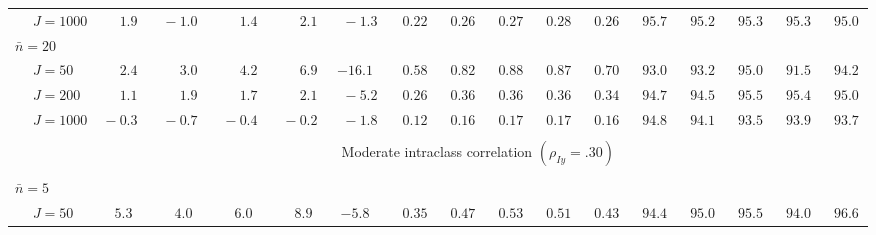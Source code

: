 \begin{sidewaystable}
\begin{threeparttable}
\begin{tabular}{llccccccccccccccc}
 & \nopagebreak $\;J=1000$  & $\phantom{0}\phantom{-}1.9\phantom{0}$ & $\phantom{0}{-}1.0\phantom{0}$ & $\phantom{0}\phantom{-}1.4\phantom{0}$ & $\phantom{0}\phantom{-}2.1\phantom{0}$ & $\phantom{0}{-}1.3\phantom{0}$ & $\phantom{0}0.22\phantom{0}$ & $\phantom{0}0.26\phantom{0}$ & $\phantom{0}0.27\phantom{0}$ & $\phantom{0}0.28\phantom{0}$ & $\phantom{0}0.26\phantom{0}$ & $\phantom{0}95.7\phantom{0}$ & $\phantom{0}95.2\phantom{0}$ & $\phantom{0}95.3\phantom{0}$ & $\phantom{0}95.3\phantom{0}$ & $\phantom{0}95.0\phantom{0}$ \\
\multicolumn{4}{l}{$\bar{n}=20$} \\  & \nopagebreak $\;J=50$  & $\phantom{0}\phantom{-}2.4\phantom{0}$ & $\phantom{0}\phantom{-}3.0\phantom{0}$ & $\phantom{0}\phantom{-}4.2\phantom{0}$ & $\phantom{0}\phantom{-}6.9\phantom{0}$ & ${-}16.1\phantom{0}$ & $\phantom{0}0.58\phantom{0}$ & $\phantom{0}0.82\phantom{0}$ & $\phantom{0}0.88\phantom{0}$ & $\phantom{0}0.87\phantom{0}$ & $\phantom{0}0.70\phantom{0}$ & $\phantom{0}93.0\phantom{0}$ & $\phantom{0}93.2\phantom{0}$ & $\phantom{0}95.0\phantom{0}$ & $\phantom{0}91.5\phantom{0}$ & $\phantom{0}94.2\phantom{0}$ \\
 & \nopagebreak $\;J=200$  & $\phantom{0}\phantom{-}1.1\phantom{0}$ & $\phantom{0}\phantom{-}1.9\phantom{0}$ & $\phantom{0}\phantom{-}1.7\phantom{0}$ & $\phantom{0}\phantom{-}2.1\phantom{0}$ & $\phantom{0}{-}5.2\phantom{0}$ & $\phantom{0}0.26\phantom{0}$ & $\phantom{0}0.36\phantom{0}$ & $\phantom{0}0.36\phantom{0}$ & $\phantom{0}0.36\phantom{0}$ & $\phantom{0}0.34\phantom{0}$ & $\phantom{0}94.7\phantom{0}$ & $\phantom{0}94.5\phantom{0}$ & $\phantom{0}95.5\phantom{0}$ & $\phantom{0}95.4\phantom{0}$ & $\phantom{0}95.0\phantom{0}$ \\
 & \nopagebreak $\;J=1000$  & $\phantom{0}{-}0.3\phantom{0}$ & $\phantom{0}{-}0.7\phantom{0}$ & $\phantom{0}{-}0.4\phantom{0}$ & $\phantom{0}{-}0.2\phantom{0}$ & $\phantom{0}{-}1.8\phantom{0}$ & $\phantom{0}0.12\phantom{0}$ & $\phantom{0}0.16\phantom{0}$ & $\phantom{0}0.17\phantom{0}$ & $\phantom{0}0.17\phantom{0}$ & $\phantom{0}0.16\phantom{0}$ & $\phantom{0}94.8\phantom{0}$ & $\phantom{0}94.1\phantom{0}$ & $\phantom{0}93.5\phantom{0}$ & $\phantom{0}93.9\phantom{0}$ & $\phantom{0}93.7\phantom{0}$ \\
[0.5ex]\hline\\[-1.6ex] 
& & \multicolumn{15}{c}{Moderate intraclass correlation $(\rho_{Iy}=.30)$} \\[0.6ex]\hline\\[-1.8ex]
\multicolumn{4}{l}{$\bar{n}=5$} \\  & \nopagebreak $\;J=50$  & $\phantom{-}5.3\phantom{0}$ & $\phantom{-}4.0\phantom{0}$ & $\phantom{-}6.0\phantom{0}$ & $\phantom{-}8.9\phantom{0}$ & ${-}5.8\phantom{0}$ & $\phantom{0}0.35\phantom{0}$ & $\phantom{0}0.47\phantom{0}$ & $\phantom{0}0.53\phantom{0}$ & $\phantom{0}0.51\phantom{0}$ & $\phantom{0}0.43\phantom{0}$ & $\phantom{0}94.4\phantom{0}$ & $\phantom{0}95.0\phantom{0}$ & $\phantom{0}95.5\phantom{0}$ & $\phantom{0}94.0\phantom{0}$ & $\phantom{0}96.6\phantom{0}$ \\

\end{tabular}
\end{threeparttable}
\end{sidewaystable}
